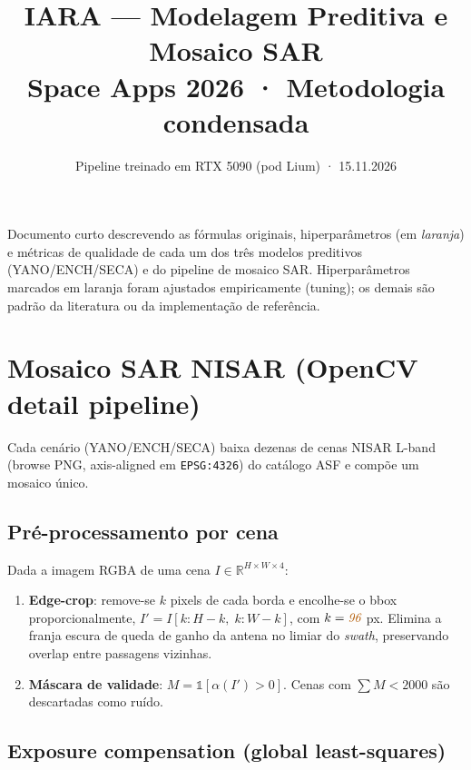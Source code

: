 \documentclass[10pt,a4paper]{article}
\title{\textbf{IARA — Modelagem Preditiva e Mosaico SAR}\\
\large Space Apps 2026 · Metodologia condensada}
\author{Pipeline treinado em RTX 5090 (pod Lium) · 15.11.2026}
\date{}
\newcommand{\tune}[1]{\textcolor{orange!70!black}{\textit{#1}}}
\begin{document}
\maketitle
\vspace{-1.5em}

Documento curto descrevendo as fórmulas originais, hiperparâmetros (em
\tune{laranja}) e métricas de qualidade de cada um dos três modelos preditivos
(YANO/ENCH/SECA) e do pipeline de mosaico SAR. Hiperparâmetros marcados em
laranja foram ajustados empiricamente (tuning); os demais são padrão da
literatura ou da implementação de referência.

\section{Mosaico SAR NISAR (OpenCV detail pipeline)}

Cada cenário (YANO/ENCH/SECA) baixa dezenas de cenas NISAR L-band (browse PNG,
axis-aligned em \texttt{EPSG:4326}) do catálogo ASF e compõe um mosaico único.

\subsection*{Pré-processamento por cena}

Dada a imagem RGBA de uma cena $I \in \mathbb{R}^{H \times W \times 4}$:

\begin{enumerate}[leftmargin=1.2em,itemsep=0pt]
  \item \textbf{Edge-crop}: remove-se $k$ pixels de cada borda e encolhe-se o
  bbox proporcionalmente,
  $I' = I[k:H-k,\;k:W-k]$, com $k=\tune{96}$ px. Elimina a franja escura de
  queda de ganho da antena no limiar do \textit{swath}, preservando overlap
  entre passagens vizinhas.

  \item \textbf{Máscara de validade}: $M = \mathbb{1}[\alpha(I') > 0]$. Cenas
  com $\sum M < 2000$ são descartadas como ruído.
\end{enumerate}

\subsection*{Exposure compensation (global least-squares)}
\end{document}
